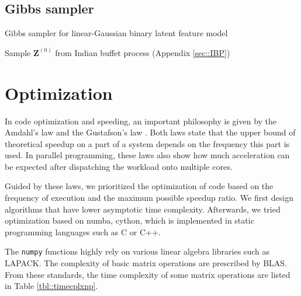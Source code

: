 \documentclass{article}
\begin{document}
\subsection{Gibbs sampler}
\begin{algorithm}
  \caption{Gibbs sampler for linear-Gaussian binary latent feature model}

  Sample $\mathbf{Z}^{(0)}$ from Indian buffet process (Appendix \ref{sec::IBP})\;
\end{algorithm}

\section{Optimization}\label{sec::optimization}
In code optimization and speeding, an important philosophy is given by the Amdahl's law \citep{Amdahl10.1145/1465482.1465560} and the Gustafson's law \citep{10.1145/42411.42415}. Both laws state that the upper bound of theoretical speedup on a part of a system depends on the frequency this part is used. In parallel programming, these laws also show how much acceleration can be expected after dispatching the workload onto multiple cores.

Guided by these laws, we prioritized the optimization of code based on the frequency of execution and the maximum possible speedup ratio. We first design algorithms that have lower asymptotic time complexity. Afterwards, we tried optimization based on numba, cython, which is implemented in static programming languages such as C or C++. 

The \texttt{numpy} functions highly rely on various linear algebra libraries such as LAPACK. The complexity of basic matrix operations are prescribed by BLAS. From these standards, the time complexity of some matrix operations are listed in Table \ref{tbl::timecplxnp}.
\end{document}
